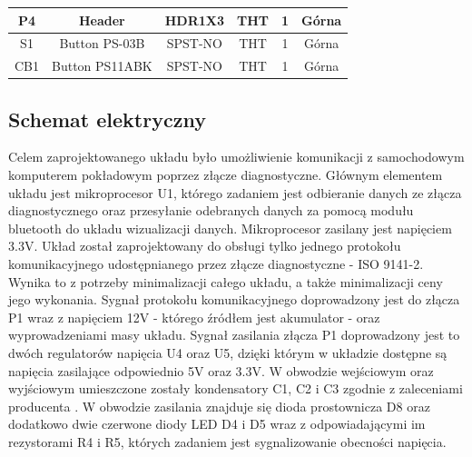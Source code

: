 \documentclass[12pt]{article} %
\numberwithin{equation}{subsection}
\numberwithin{figure}{section}
\numberwithin{table}{section}
\begin{document}
\begin{table}[!h]
\begin{tabular}{|c|c|c|c|c|c|}
P4                  & Header                 & HDR1X3           & THT             & 1              & Górna            \\ \hline
S1                  & Button PS-03B          & SPST-NO          & THT             & 1              & Górna            \\ \hline
CB1                 & Button PS11ABK         & SPST-NO          & THT             & 1              & Górna            \\ \hline
\end{tabular}
\end{table}

\newpage
	
	\newpage
	\subsection{Schemat elektryczny}
	
		\hspace{0.5cm}Celem zaprojektowanego układu było umożliwienie komunikacji z samochodowym komputerem pokładowym poprzez złącze diagnostyczne. Głównym elementem układu jest mikroprocesor U1, którego zadaniem jest odbieranie danych ze złącza diagnostycznego oraz przesyłanie odebranych danych za pomocą modułu bluetooth do układu wizualizacji danych. Mikroprocesor zasilany jest napięciem 3.3V. Układ został zaprojektowany do obsługi tylko jednego protokołu komunikacyjnego udostępnianego przez złącze diagnostyczne - ISO 9141-2. Wynika to z potrzeby minimalizacji całego układu, a także minimalizacji ceny jego wykonania. Sygnał protokołu komunikacyjnego doprowadzony jest do złącza P1 wraz z napięciem 12V - którego źródłem jest akumulator - oraz wyprowadzeniami masy układu. Sygnał zasilania złącza P1 doprowadzony jest to dwóch regulatorów napięcia U4 oraz U5, dzięki którym w układzie dostępne są napięcia zasilające odpowiednio 5V oraz 3.3V. W obwodzie wejściowym oraz wyjściowym umieszczone zostały kondensatory C1, C2 i C3 zgodnie z zaleceniami producenta \cite{MC7805}\cite{MCP17}. W obwodzie zasilania znajduje się dioda prostownicza D8 oraz dodatkowo dwie czerwone diody LED D4 i D5 wraz z odpowiadającymi im rezystorami R4 i R5, których zadaniem jest sygnalizowanie obecności napięcia.
		
\end{document}

